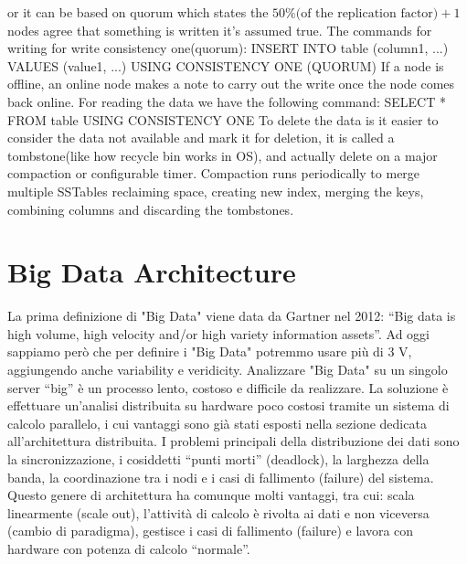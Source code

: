 \documentclass[a4page, 11pt]{article}
\begin{document}
or it can be based on quorum which states the $50\%\text{(of the replication factor)}+1$ nodes agree that something is written it's assumed true.
\newline
The commands for writing for write consistency one(quorum): \newline
INSERT INTO table (column1, ...) VALUES (value1, ...) USING CONSISTENCY ONE (QUORUM)\newline
If a node is offline, an online node makes a note to carry out the write once the node comes back online.
For reading the data we have the following command:
SELECT * FROM table USING CONSISTENCY ONE
\newline
To delete the data is it easier to consider the data not available and mark it for deletion, it is called a tombstone(like how recycle bin works in OS), and actually delete on a major compaction or configurable timer.\newline
Compaction runs periodically to merge multiple SSTables reclaiming space, creating new index, merging the keys, combining columns and discarding the tombstones.

\section{Big Data Architecture}
La prima definizione di "Big Data" viene data da Gartner nel 2012: “Big data is high volume, high velocity and/or high variety information assets”. Ad oggi sappiamo però che per definire i "Big Data" potremmo usare più di 3 V, aggiungendo anche variability e veridicity. Analizzare "Big Data" su un singolo server “big” è un processo lento, costoso e difficile da realizzare. La soluzione è effettuare un’analisi distribuita su hardware poco costosi tramite un sistema di calcolo parallelo, i cui vantaggi sono già stati esposti nella sezione dedicata all'architettura distribuita. I problemi principali della distribuzione dei dati sono la sincronizzazione, i cosiddetti “punti morti” (deadlock), la larghezza della banda, la coordinazione tra i nodi e i casi di fallimento (failure) del sistema. Questo genere di architettura ha comunque molti vantaggi, tra cui: scala linearmente (scale out), l’attività di calcolo è rivolta ai dati e non viceversa (cambio di paradigma), gestisce i casi di fallimento (failure) e lavora con hardware con potenza di calcolo “normale”.
\end{document}
